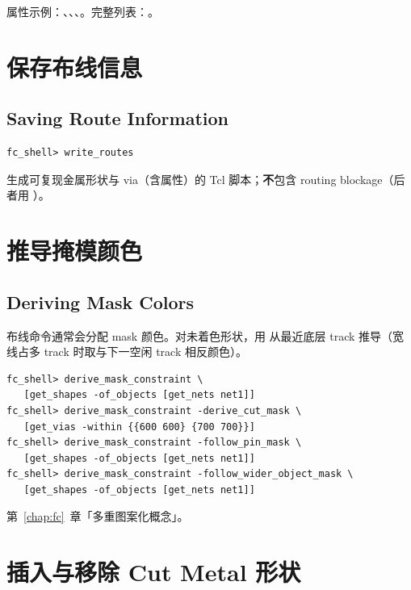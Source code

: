 属性示例：、、、。完整列表：。

\section{保存布线信息}
\subsection*{Saving Route Information}

\begin{lstlisting}
fc_shell> write_routes
\end{lstlisting}

生成可复现金属形状与 via（含属性）的 Tcl 脚本；\textbf{不}包含 routing blockage（后者用 ）。

\section{推导掩模颜色}
\subsection*{Deriving Mask Colors}

布线命令通常会分配 mask 颜色。对未着色形状，用  从最近底层 track 推导（宽线占多 track 时取与下一空闲 track 相反颜色）。

\begin{lstlisting}
fc_shell> derive_mask_constraint \
   [get_shapes -of_objects [get_nets net1]]
fc_shell> derive_mask_constraint -derive_cut_mask \
   [get_vias -within {{600 600} {700 700}}]
fc_shell> derive_mask_constraint -follow_pin_mask \
   [get_shapes -of_objects [get_nets net1]]
fc_shell> derive_mask_constraint -follow_wider_object_mask \
   [get_shapes -of_objects [get_nets net1]]
\end{lstlisting}

\begin{seeAlsoBox}
第~\ref{chap:fc}~章「多重图案化概念」。
\end{seeAlsoBox}

\section{插入与移除 Cut Metal 形状}
